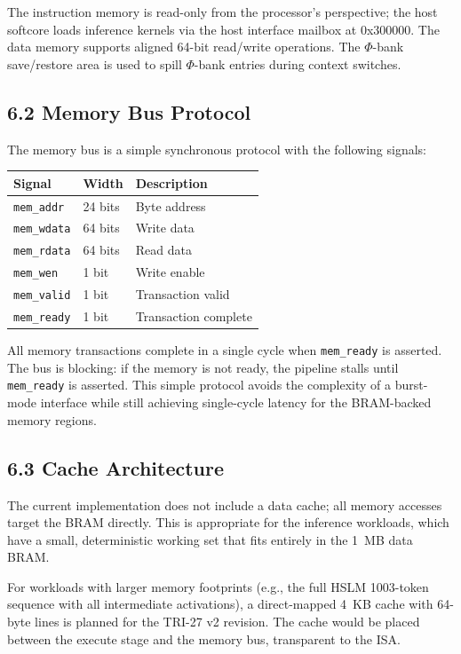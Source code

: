 The instruction memory is read-only from the processor's
perspective; the host softcore loads inference kernels via the
host interface mailbox at 0x300000. The data memory supports
aligned 64-bit read/write operations. The $\Phi$-bank save/restore
area is used to spill $\Phi$-bank entries during context switches.

\subsection{6.2 Memory Bus Protocol}\label{fa_71:memory-bus}

The memory bus is a simple synchronous protocol with the
following signals:

\begin{longtable}[]{@{}llp{6cm}@{}}
\toprule\noalign{}
Signal & Width & Description \\
\midrule\noalign{}
\endhead
\bottomrule\noalign{}
\endlastfoot
\texttt{mem\_addr} & 24 bits & Byte address \\
\texttt{mem\_wdata} & 64 bits & Write data \\
\texttt{mem\_rdata} & 64 bits & Read data \\
\texttt{mem\_wen} & 1 bit & Write enable \\
\texttt{mem\_valid} & 1 bit & Transaction valid \\
\texttt{mem\_ready} & 1 bit & Transaction complete \\
\end{longtable}

All memory transactions complete in a single cycle when
\texttt{mem\_ready} is asserted. The bus is blocking: if the
memory is not ready, the pipeline stalls until \texttt{mem\_ready}
is asserted. This simple protocol avoids the complexity of a
burst-mode interface while still achieving single-cycle latency
for the BRAM-backed memory regions.

\subsection{6.3 Cache Architecture}\label{fa_71:cache}

The current implementation does not include a data cache; all
memory accesses target the BRAM directly. This is appropriate for
the inference workloads, which have a small, deterministic
working set that fits entirely in the 1~MB data BRAM.

For workloads with larger memory footprints (e.g., the full
HSLM 1003-token sequence with all intermediate activations), a
direct-mapped 4~KB cache with 64-byte lines is planned for the
TRI-27 v2 revision. The cache would be placed between the
execute stage and the memory bus, transparent to the ISA.

